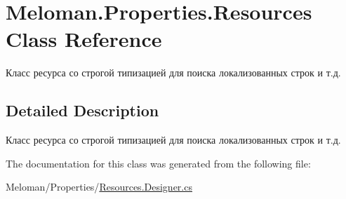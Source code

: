 \hypertarget{class_meloman_1_1_properties_1_1_resources}{}\section{Meloman.\+Properties.\+Resources Class Reference}
\label{class_meloman_1_1_properties_1_1_resources}


Класс ресурса со строгой типизацией для поиска локализованных строк и т.\+д.  




\subsection{Detailed Description}
Класс ресурса со строгой типизацией для поиска локализованных строк и т.\+д. 



The documentation for this class was generated from the following file\+:\begin{DoxyCompactItemize}
\item 
Meloman/\+Properties/\mbox{\hyperlink{_resources_8_designer_8cs}{Resources.\+Designer.\+cs}}\end{DoxyCompactItemize}
